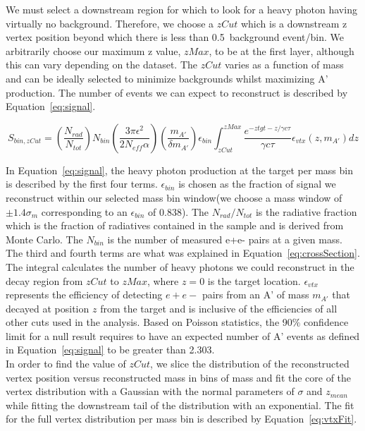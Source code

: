 We must select a downstream region for which to look for a heavy photon having virtually no background. Therefore, we choose a $zCut$ which is a downstream z vertex position beyond which there is less than 0.5~background event/bin. We arbitrarily choose our maximum z value, $zMax$, to be at the first layer, although this can vary depending on the dataset. The $zCut$ varies as a function of mass and can be ideally selected to minimize backgrounds whilst maximizing A' production. The number of events we can expect to reconstruct is described by Equation~\eqref{eq:signal}.

\begin{equation}
\label{eq:signal}
S_{bin,zCut} = \left( \dfrac{N_{rad}}{N_{tot}}\right) N_{bin}\left(\dfrac{3\pi\epsilon^{2}}{2N_{eff}\alpha}\right)\left(\dfrac{m_{A'}}{\delta m_{A'}}\right)\epsilon_{bin}\int_{zCut}^{zMax}\dfrac{e^{-ztgt-z/\gamma c\tau}}{\gamma c \tau}\epsilon_{vtx}(z,m_{A'})dz
\end{equation}

In Equation~\eqref{eq:signal}, the heavy photon production at the target per mass bin is described by the first four terms. $\epsilon_{bin}$ is chosen as the fraction of signal we reconstruct within our selected mass bin window(we choose a mass window of $\pm1.4\sigma_m$ corresponding to an $\epsilon_{bin}$ of 0.838). The $N_{rad}/N_{tot}$ is the radiative fraction which is the fraction of radiatives contained in the sample and is derived from Monte Carlo. The $N_{bin}$ is the number of measured e+e- pairs at a given mass. The third and fourth terms are what was explained in Equation~\eqref{eq:crossSection}. The integral calculates the number of heavy photons we could reconstruct in the decay region from $zCut$ to $zMax$, where $z=0$ is the target location. $\epsilon_{vtx}$ represents the efficiency of detecting $e+e-$ pairs from an A' of mass $m_{A'}$ that decayed at position $z$ from the target and is inclusive of the efficiencies of all other cuts used in the analysis. Based on Poisson statistics, the 90$\%$ confidence limit for a null result requires to have an expected number of A' events as defined in Equation~\ref{eq:signal} to be greater than 2.303.\\
\indent In order to find the value of $zCut$, we slice the distribution of the reconstructed vertex position versus reconstructed mass in bins of mass and fit the core of the vertex distribution with a Gaussian with the normal parameters of $\sigma$ and $z_{mean}$ while fitting the downstream tail of the distribution with an exponential. The fit for the full vertex distribution per mass bin is described by Equation~\eqref{eq:vtxFit}.

